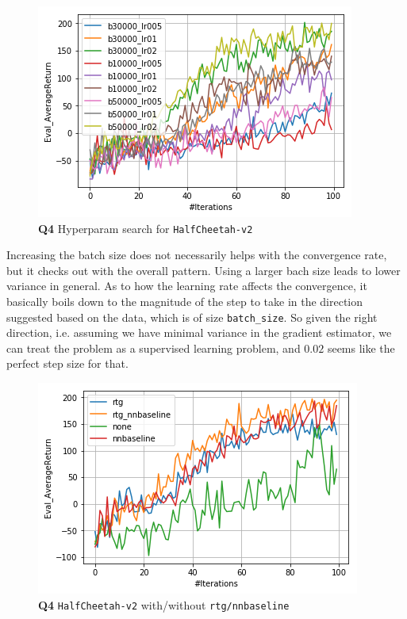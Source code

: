 \documentclass[11pt]{article}
\begin{document}
\begin{figure}[htbp]
\centering
\includegraphics[width=.9\linewidth]{./41.png}
\caption{\textbf{Q4} Hyperparam search for \texttt{HalfCheetah-v2}}
\end{figure}

Increasing the batch size does not necessarily helps with the convergence rate, but it checks out with the overall pattern. Using a larger bach size leads to lower variance in general. As to how the learning rate affects the convergence, it basically boils down to the magnitude of the step to take in the direction suggested based on the data, which is of size \texttt{batch\_size}. So given the right direction, i.e. assuming we have minimal variance in the gradient estimator, we can treat the problem as a supervised learning problem, and \(0.02\) seems like the perfect step size for that.

\begin{figure}[htbp]
\centering
\includegraphics[width=.9\linewidth]{./42.png}
\caption{\textbf{Q4} \texttt{HalfCheetah-v2} with/without \texttt{rtg/nnbaseline}}
\end{figure}
\end{document}
